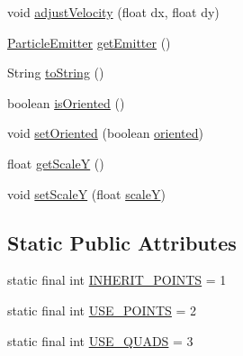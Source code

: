\begin{DoxyCompactItemize}
\item 
void \mbox{\hyperlink{classorg_1_1newdawn_1_1slick_1_1particles_1_1_particle_a241c6e466f7c1aa7d9155d226840ca3d}{adjust\+Velocity}} (float dx, float dy)
\item 
\mbox{\hyperlink{interfaceorg_1_1newdawn_1_1slick_1_1particles_1_1_particle_emitter}{Particle\+Emitter}} \mbox{\hyperlink{classorg_1_1newdawn_1_1slick_1_1particles_1_1_particle_a88890a6068c4d88838f566b29c321d21}{get\+Emitter}} ()
\item 
String \mbox{\hyperlink{classorg_1_1newdawn_1_1slick_1_1particles_1_1_particle_a4866f0c7c0daa43c7773cf124a2d5a08}{to\+String}} ()
\item 
boolean \mbox{\hyperlink{classorg_1_1newdawn_1_1slick_1_1particles_1_1_particle_af44a98acb64ff4d91981716b088e977d}{is\+Oriented}} ()
\item 
void \mbox{\hyperlink{classorg_1_1newdawn_1_1slick_1_1particles_1_1_particle_aff280f67ae5c5e59da6ae0378bef065c}{set\+Oriented}} (boolean \mbox{\hyperlink{classorg_1_1newdawn_1_1slick_1_1particles_1_1_particle_ad5b898bd35ce1b209c5f6372b1667fc2}{oriented}})
\item 
float \mbox{\hyperlink{classorg_1_1newdawn_1_1slick_1_1particles_1_1_particle_a49022532a526617c26564cd31f02e8b9}{get\+ScaleY}} ()
\item 
void \mbox{\hyperlink{classorg_1_1newdawn_1_1slick_1_1particles_1_1_particle_a13ad6fc66ed33031a6c26c51056fa39e}{set\+ScaleY}} (float \mbox{\hyperlink{classorg_1_1newdawn_1_1slick_1_1particles_1_1_particle_a0dacb1e81d57ee4528c8ac82033eb585}{scaleY}})
\end{DoxyCompactItemize}
\subsection*{Static Public Attributes}
\begin{DoxyCompactItemize}
\item 
static final int \mbox{\hyperlink{classorg_1_1newdawn_1_1slick_1_1particles_1_1_particle_a6ecc8039f2f03eab74b6b22ce786d176}{I\+N\+H\+E\+R\+I\+T\+\_\+\+P\+O\+I\+N\+TS}} = 1
\item 
static final int \mbox{\hyperlink{classorg_1_1newdawn_1_1slick_1_1particles_1_1_particle_afbb27555302a14e40de7feb81fd1c916}{U\+S\+E\+\_\+\+P\+O\+I\+N\+TS}} = 2
\item 
static final int \mbox{\hyperlink{classorg_1_1newdawn_1_1slick_1_1particles_1_1_particle_a9a04f13945c63274a3eaf725f0bace95}{U\+S\+E\+\_\+\+Q\+U\+A\+DS}} = 3
\end{DoxyCompactItemize}
